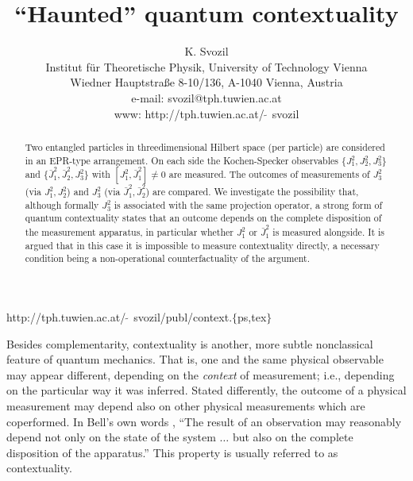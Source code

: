 

\def\frak{\cal }
\def\Bbb{\bf }

\title{``Haunted'' quantum contextuality}
\author{K. Svozil\\
 {\small Institut f\"ur Theoretische Physik,}
  {\small University of Technology Vienna }     \\
  {\small Wiedner Hauptstra\ss e 8-10/136,}
  {\small A-1040 Vienna, Austria   }            \\
  {\small e-mail: svozil@tph.tuwien.ac.at}\\
  {\small www: http://tph.tuwien.ac.at/$\widetilde{\;\;}\,$svozil}}
\date{ }
\maketitle

\begin{flushright}
{\scriptsize http://tph.tuwien.ac.at/$\widetilde{\;\;}\,$svozil/publ/context.$\{$ps,tex$\}$}
\end{flushright}

\begin{abstract}
Two entangled particles in threedimensional
Hilbert space (per particle) are considered in an EPR-type arrangement. On each side
the  Kochen-Specker observables $\{J_1^2,J_2^2,J_3^2\}$ and $\{\bar J_1^2,
\bar J_2^2,J_3^2\}$ with $[J_1^2,\bar J_1^2]\neq
0$ are measured.
The outcomes of measurements of  $J_3^2$ (via $J_1^2,J_2^2$) and $J_3^2$
(via $\bar J_1^2,\bar J_2^2$) are compared.
We investigate the possibility that,
although formally $J_3^2$ is associated with the same projection
operator,
a strong form of quantum contextuality states that an outcome
depends on the complete disposition of the measurement apparatus,
in particular whether $J_1^2$  or $\bar J_1^2$ is measured alongside.
It is argued that in this case it is impossible to measure contextuality directly,
a necessary condition being a non-operational counterfactuality of the argument.
\end{abstract}



Besides complementarity, contextuality
\cite{bell-66,hey-red,redhead,peres,mermin-93}
is another, more subtle nonclassical feature of quantum mechanics.
That is, one and the same physical observable may
appear different, depending on the {\em context} of measurement;
i.e., depending on the particular way it was inferred. Stated
differently, the outcome of a physical measurement
may depend also on other physical measurements
which are coperformed.
In Bell's own words \cite[section 5]{bell-66}, ``The result of an
observation may
reasonably depend not only on the state of the system $\ldots $ but also
on the complete disposition of the apparatus.'' This property is usually
referred to as contextuality.


